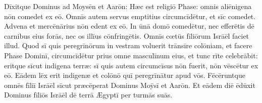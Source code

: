 Dīxitque Dominus ad Moysēn et Aarōn: Hæc est religiō Phase: omnis
aliēnigena nōn comedet ex eō. Omnīs autem servus
emptitius circumcīdētur, et sīc comedet. Advena et
mercēnārius nōn edent ex eō. In ūnā domō comedētur, nec
efferētis dē carnibus eius forās, nec os illīus
cōnfringētis. Omnīs cœtūs fīliōrum
Isrāēl faciet illud. Quod sī quis peregrīnōrum in
vestram voluerit trānsīre colōniam, et facere Phase Dominī,
circumcīdētur prius omne masculīnum eius, et tunc rīte
celebrābit: eritque sīcut indigena terræ:
sī quis autem circumcīsus nōn fuerit, nōn
vēscētur ex eō. Eādem lēx erit indigenæ
et colōnō quī peregrīnātur apud vōs. Fēcēruntque omnēs
fīliī Isrāēl sīcut præcēperat Dominus Moȳsī et Aarōn. Et eādem diē
ēdūxit Dominus fīliōs Isrāēl dē terrā Ægyptī per turmās
suās. 
